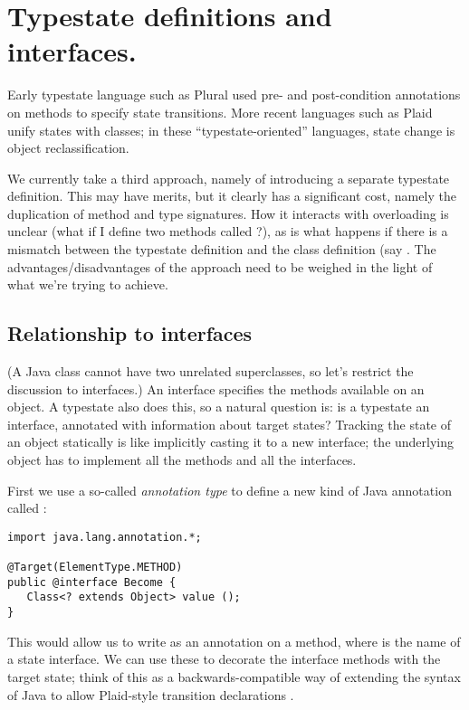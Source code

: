 \section{Typestate definitions and interfaces.}

Early typestate language such as Plural \cite{bierhoff11} used pre-
and post-condition annotations on methods to specify state
transitions. More recent languages such as Plaid \cite{garcia14} unify
states with classes; in these ``typestate-oriented'' languages, state
change is object reclassification.

We currently take a third approach, namely of introducing a separate
typestate definition. This may have merits, but it clearly has a
significant cost, namely the duplication of method and type
signatures. How it interacts with overloading is unclear (what if I
define two methods called ?), as is what happens if there is
a mismatch between the typestate definition and the class definition
(say . The advantages/disadvantages of the approach need to be weighed
in the light of what we're trying to achieve.

\subsection{Relationship to interfaces}

(A Java class cannot have two unrelated superclasses, so let's
restrict the discussion to interfaces.) An interface specifies the
methods available on an object. A typestate also does this, so a
natural question is: is a typestate an interface, annotated with
information about target states? Tracking the state of an object
statically is like implicitly casting it to a new interface; the
underlying object has to implement all the methods and all the
interfaces.

First we use a so-called \emph{annotation type} to define a new kind
of Java annotation called :

\begin{lstlisting}
import java.lang.annotation.*;

@Target(ElementType.METHOD)
public @interface Become {
   Class<? extends Object> value ();
}
\end{lstlisting}

\noindent This would allow us to write  as
an annotation on a method, where  is the name of a state
interface. We can use these to decorate the interface methods with the
target state; think of this as a backwards-compatible way of extending
the syntax of Java to allow Plaid-style transition declarations
\cite{garcia14}.

